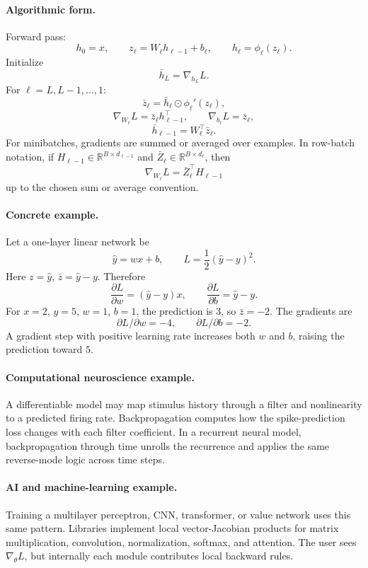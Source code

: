 \paragraph{Algorithmic form.}
Forward pass:
\[
h_0=x,\qquad
z_\ell=W_\ell h_{\ell-1}+b_\ell,\qquad
h_\ell=\phi_\ell(z_\ell).
\]
Initialize
\[
\bar h_L=\nabla_{h_L}L.
\]
For \(\ell=L,L-1,\ldots,1\):
\[
\bar z_\ell=\bar h_\ell\odot\phi_\ell'(z_\ell),
\]
\[
\nabla_{W_\ell}L=\bar z_\ell h_{\ell-1}^\top,
\qquad
\nabla_{b_\ell}L=\bar z_\ell,
\]
\[
\bar h_{\ell-1}=W_\ell^\top\bar z_\ell.
\]
For minibatches, gradients are summed or averaged over examples. In row-batch notation, if \(H_{\ell-1}\in\mathbb R^{B\times d_{\ell-1}}\) and \(\bar Z_\ell\in\mathbb R^{B\times d_\ell}\), then
\[
\nabla_{W_\ell}L=\bar Z_\ell^\top H_{\ell-1}
\]
up to the chosen sum or average convention.

\paragraph{Concrete example.}
Let a one-layer linear network be
\[
\widehat y=wx+b,\qquad L=\frac12(\widehat y-y)^2.
\]
Here \(z=\widehat y\), \(\bar z=\widehat y-y\). Therefore
\[
\frac{\partial L}{\partial w}=(\widehat y-y)x,\qquad
\frac{\partial L}{\partial b}=\widehat y-y.
\]
For \(x=2\), \(y=5\), \(w=1\), \(b=1\), the prediction is \(3\), so \(\bar z=-2\). The gradients are
\[
\partial L/\partial w=-4,\qquad
\partial L/\partial b=-2.
\]
A gradient step with positive learning rate increases both \(w\) and \(b\), raising the prediction toward \(5\).

\paragraph{Computational neuroscience example.}
A differentiable model may map stimulus history through a filter and nonlinearity to a predicted firing rate. Backpropagation computes how the spike-prediction loss changes with each filter coefficient. In a recurrent neural model, backpropagation through time unrolls the recurrence and applies the same reverse-mode logic across time steps.

\paragraph{AI and machine-learning example.}
Training a multilayer perceptron, CNN, transformer, or value network uses this same pattern. Libraries implement local vector-Jacobian products for matrix multiplication, convolution, normalization, softmax, and attention. The user sees \(\nabla_\theta L\), but internally each module contributes local backward rules.


